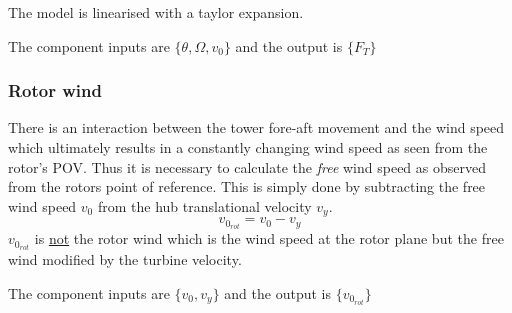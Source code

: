 The model is linearised with a taylor expansion.

The component inputs are $ \{\theta, \Omega, v_0 \} $ and the output is $ \{F_T\} $


\subsubsection{Rotor wind}
There is an interaction between the tower fore-aft movement and the wind speed which ultimately results in a constantly changing wind speed as seen from the rotor's POV. Thus it is necessary to calculate the \textit{free} wind speed as observed from the rotors point of reference. This is simply done by subtracting the free wind speed $ v_0 $ from the hub translational velocity $ v_y $.
\begin{equation}\label{eq:wtlin_comp_rotorwind}
	v_{0_{rot}} = v_{0} - v_y
\end{equation}
$ v_{0_{rot}} $ is \underline{not} the rotor wind which is the wind speed at the rotor plane but the free wind modified by the turbine velocity.

The component inputs are $ \{v_0, v_y\} $ and the output is $ \{v_{0_{rot}}\} $


